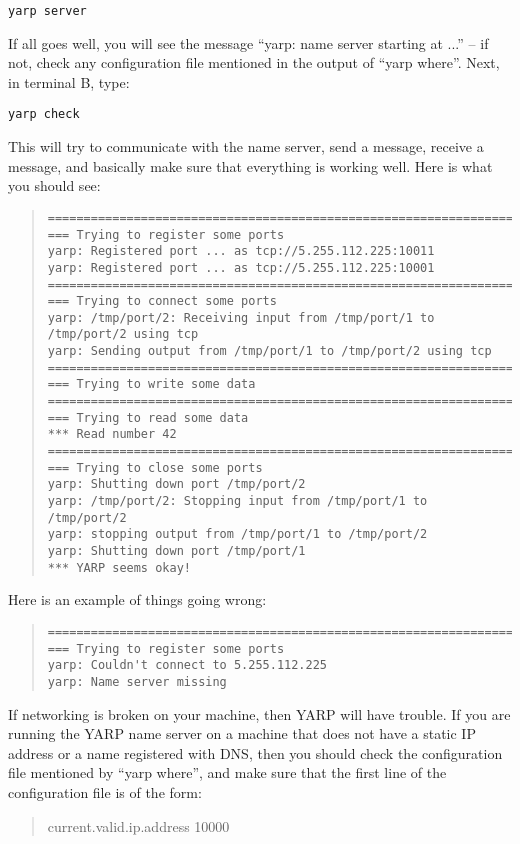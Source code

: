 \documentclass[a4]{article}
\begin{document}
\begin{verbatim}
yarp server
\end{verbatim}

If all goes well, you will see the message ``yarp: name server starting at ...'' -- if not, check any configuration file
mentioned in the output of ``yarp where''.
%
Next, in terminal B, type:
%
\begin{verbatim}
yarp check
\end{verbatim}
%
This will try to communicate with the name server, send a message,
receive a message, and basically make sure that everything is
working well.  Here is what you should see:

\begin{quote}
{\small
\begin{verbatim}
==================================================================
=== Trying to register some ports
yarp: Registered port ... as tcp://5.255.112.225:10011
yarp: Registered port ... as tcp://5.255.112.225:10001
==================================================================
=== Trying to connect some ports
yarp: /tmp/port/2: Receiving input from /tmp/port/1 to /tmp/port/2 using tcp
yarp: Sending output from /tmp/port/1 to /tmp/port/2 using tcp
==================================================================
=== Trying to write some data
==================================================================
=== Trying to read some data
*** Read number 42
==================================================================
=== Trying to close some ports
yarp: Shutting down port /tmp/port/2
yarp: /tmp/port/2: Stopping input from /tmp/port/1 to /tmp/port/2
yarp: stopping output from /tmp/port/1 to /tmp/port/2
yarp: Shutting down port /tmp/port/1
*** YARP seems okay!
\end{verbatim}
}
\end{quote}
%
\noindent
Here is an example of things going wrong:
%
\begin{quote}
{\small
\begin{verbatim}
==================================================================
=== Trying to register some ports
yarp: Couldn't connect to 5.255.112.225
yarp: Name server missing
\end{verbatim}
}
\end{quote}

If networking is broken on your machine, then YARP will have trouble.
If you are running the YARP name server on a machine that does not
have a static IP address or a name registered with DNS, then you
should check the configuration file mentioned by ``yarp where'', and
make sure that the first line of the configuration file is of the form:
\begin{quote}
  current.valid.ip.address 10000
\end{quote}
\end{document}
